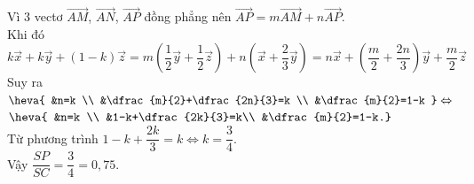 \begin{bt}
{		Vì $3$ vectơ $\overrightarrow{AM}$, $\overrightarrow{AN}$,  $\overrightarrow{AP}$ đồng phẳng nên $\overrightarrow{AP}=m\overrightarrow{AM}+n\overrightarrow{AP}$.\\
		Khi  đó $k\overrightarrow{x}+k\overrightarrow{y}+(1-k)\overrightarrow{z}=m\left(\dfrac{1}{2}\overrightarrow{y}+\dfrac{1}{2}\overrightarrow{z}\right)+n\left(\overrightarrow{x}+\dfrac{2}{3}\overrightarrow{y}\right)=n\overrightarrow{x}+\left(\dfrac{m}{2}+\dfrac{2n}{3}\right)\overrightarrow{y}+\dfrac{m}{2}\overrightarrow{z}$\\
		Suy ra$\heva{ 
		 &n=k \\
		 &\dfrac{m}{2}+\dfrac{2n}{3}=k \\
		&\dfrac{m}{2}=1-k 
		}\Leftrightarrow$ 
		 $\heva{
		&n=k  \\
		&1-k+\dfrac{2k}{3}=k\\ 
		 &\dfrac{m}{2}=1-k.}$\\ Từ phương trình $1-k+\dfrac{2k}{3}=k
		 \Leftrightarrow k=\dfrac{3}{4}.$\\
	 Vậy $\dfrac{SP}{SC}=\dfrac{3}{4}=0{,}75$.}
\end{bt}

